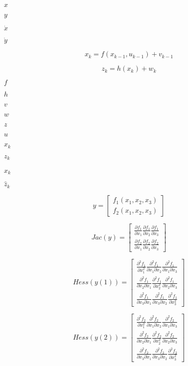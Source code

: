 \documentclass{article}
\begin{document}
$x$
\pagebreak

$y$
\pagebreak

$\dot{x}$
\pagebreak

$\dot{y}$
\pagebreak

\[x_k = f(x_{k-1}, u_{k-1}) + v_{k-1}\]
\pagebreak

\[z_k = h(x_k) + w_k\]
\pagebreak

$f$
\pagebreak

$h$
\pagebreak

$v$
\pagebreak

$w$
\pagebreak

$z$
\pagebreak

$u$
\pagebreak

$x_k$
\pagebreak

$z_k$
\pagebreak

$\hat{x}_k$
\pagebreak

$\hat{z}_k$
\pagebreak

\[y = \begin{bmatrix} f_1(x_1,x_2,x_3) \\ f_2(x_1,x_2,x_3) \end{bmatrix} \]
\pagebreak

\[Jac(y)=\begin{bmatrix} \frac{\partial f_1}{\partial x_1} \frac{\partial f_1}{\partial x_2} \frac{\partial f_1}{\partial x_3} \\ \frac{\partial f_2}{\partial x_1} \frac{\partial f_2}{\partial x_2} \frac{\partial f_2}{\partial x_3} \end{bmatrix} \]
\pagebreak

\[Hess(y(1)) =\begin{bmatrix} \frac{\partial^2 f_1}{\partial x_1^2} \frac{\partial^2 f_1}{\partial x_1 \partial x_2} \frac{\partial^2 f_1}{\partial x_1 \partial x_3} \\ \frac{\partial^2 f_1}{\partial x_2 \partial x_1} \frac{\partial^2 f_1}{\partial x_2^2} \frac{\partial^2 f_1}{\partial x_2 \partial x_3} \\ \frac{\partial^2 f_1}{\partial x_3 \partial x_1} \frac{\partial^2 f_1}{\partial x_3 \partial x_2} \frac{\partial^2 f_1}{\partial x_3^2} \end{bmatrix} \]
\pagebreak

\[Hess(y(2)) =\begin{bmatrix} \frac{\partial^2 f_2}{\partial x_1^2} \frac{\partial^2 f_2}{\partial x_1 \partial x_2} \frac{\partial^2 f_2}{\partial x_1 \partial x_3} \\ \frac{\partial^2 f_2}{\partial x_2 \partial x_1} \frac{\partial^2 f_2}{\partial x_2^2} \frac{\partial^2 f_2}{\partial x_2 \partial x_3} \\ \frac{\partial^2 f_2}{\partial x_3 \partial x_1} \frac{\partial^2 f_2}{\partial x_3 \partial x_2} \frac{\partial^2 f_2}{\partial x_3^2} \end{bmatrix} \]
\pagebreak
\end{document}
